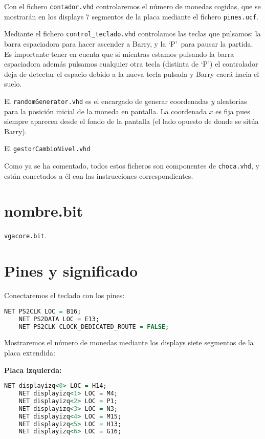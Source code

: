 \documentclass[11pt, a4paper, spanish, openright, twoside]{book}
\begin{document}
Con el fichero \texttt{contador.vhd} controlaremos el número de monedas cogidas, que se mostrarán en los displays 7 segmentos de la placa mediante el fichero \texttt{pines.ucf}.

Mediante el fichero \texttt{control\_teclado.vhd} controlamos las teclas que pulsamos: la barra espaciadora para hacer ascender a Barry, y la `P'\ para pausar la partida. Es importante tener en cuenta que si mientras estamos pulsando la barra espaciadora además pulsamos cualquier otra tecla (distinta de `P') el controlador deja de detectar el espacio debido a la nueva tecla pulsada y Barry caerá hacia el suelo.

El \texttt{randomGenerator.vhd} es el encargado de generar coordenadas $y$ aleatorias para la posición inicial de la moneda en pantalla. La coordenada $x$ es fija pues siempre aparecen desde el fondo de la pantalla (el lado opuesto de donde se sitúa Barry).

El \texttt{gestorCambioNivel.vhd}  %

Como ya se ha comentado, todos estos ficheros son componentes de \texttt{choca.vhd}, y están conectados a él con las instrucciones correspondientes.

\section{nombre.bit}

\texttt{vgacore.bit}.

\section{Pines y significado}
Conectaremos el teclado con los pines:

\begin{lstlisting}[language=VHDL]
	NET PS2CLK LOC = B16;
	NET PS2DATA LOC = E13;
	NET PS2CLK CLOCK_DEDICATED_ROUTE = FALSE;
\end{lstlisting}


Mostraremos el número de monedas mediante los displays siete segmentos de la placa extendida:

\textbf{Placa izquierda:}

\begin{lstlisting}[language=VHDL]
	NET displayizq<0> LOC = H14;
	NET displayizq<1> LOC = M4;
	NET displayizq<2> LOC = P1;
	NET displayizq<3> LOC = N3;
	NET displayizq<4> LOC = M15;
	NET displayizq<5> LOC = H13;
	NET displayizq<6> LOC = G16;
\end{lstlisting}
\end{document}
